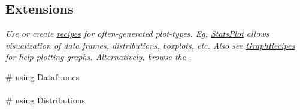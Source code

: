 \subsection*{Extensions}
\textit{Use or create \href{http://docs.juliaplots.org/latest/recipes/\#recipes-1}{recipes} for often-generated plot-types. Eg, \href{https://github.com/JuliaPlots/StatsPlots.jl}{StatsPlot} allows visualization of data frames, distributions, boxplots, etc. Also see \href{https://github.com/JuliaPlots/GraphRecipes.jl}{GraphRecipes} for help plotting graphs. Alternatively, browse the .}


 \# using Dataframes\\
 \\ 
 \# using Distributions  \\

